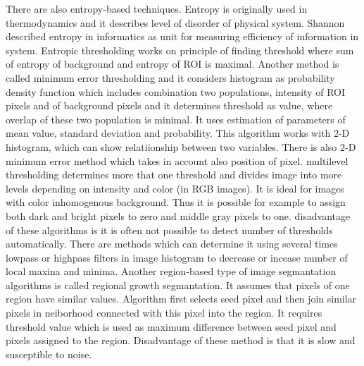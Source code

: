         There are also entropy-based techniques. Entropy is originally
        used in thermodynamics and it describes level of disorder of physical system. Shannon described entropy in informatics as unit for measuring efficiency of information in system.
        Entropic thresholding works on principle of finding threshold where sum of entropy of background and entropy of ROI is maximal. Another method is called minimum error thresholding
        and it considers histogram as probability density function which includes combination two populations, intensity of ROI pixels and of background pixels and
        it determines threshold as value, where overlap of these two population is minimal. It uses estimation of parameters of mean value, standard deviation and probability.
        This algorithm works with 2-D histogram, which can show relatiionship between two variables. There is also 2-D minimum error method which takes in account also position of pixel.
        multilevel thresholding determines more that one threshold and divides image into more levels depending on intensity and color (in RGB images). It is ideal for images with color
        inhomogenous background. Thus it is possible for example to assign both dark and bright pixels to zero and middle gray pixels to one. disadvantage of these algorithms is
        it is often not possible to detect number of thresholds automatically. There are methods which can determine it using several times lowpass or highpass filters in image histogram
        to decrease or incease number of local maxina and minima.
        Another region-based type of image segmantation algorithms is called regional growth segmantation. It assumes that pixels of one region have similar values. Algorithm first selects
        seed pixel and then join similar pixels in neiborhood connected with this pixel into the region. It requires threshold value which is used as maximum difference between seed pixel
        and pixels assigned to the region. Disadvantage of these method is that it is slow and susceptible to noise. \cite{15, 16, 17, 18}

